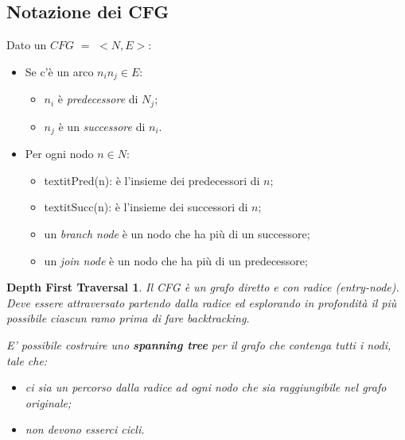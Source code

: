 \documentclass[a4paper, 11pt]{report}
\begin{document}
\subsection*{Notazione dei CFG}
Dato un $CFG$ $=$ $<N, E>$:
\begin{itemize}
	\item Se c'è un arco $n_in_j\in E$:
	\begin{itemize}
		\item $n_i$ è \textit{predecessore} di $N_j$;
		\item $n_j$ è un \textit{successore} di $n_i$.
	\end{itemize}
	\item Per ogni nodo $n\in N$:
	\begin{itemize}
		\item textit{Pred(n)}: è l'insieme dei predecessori di $n$;
		\item textit{Succ(n)}: è l'insieme dei successori di $n$;
		\item un \textit{branch node} è un nodo che ha più di un successore;
		\item un \textit{join node} è un nodo che ha più di un predecessore; 
	\end{itemize}
\end{itemize}

\newtheorem*{definit2}{Depth First Traversal}
\begin{definit2}
	Il CFG è un grafo diretto e con radice (entry-node). Deve essere attraversato partendo dalla radice ed esplorando in profondità il più possibile ciascun ramo prima di fare backtracking.
	
	E' possibile costruire uno \textbf{spanning tree} per il grafo che contenga tutti i nodi, tale che:
	\begin{itemize}
		\item ci sia un percorso dalla radice ad ogni nodo che sia raggiungibile nel grafo originale;
		\item non devono esserci cicli.
	\end{itemize}
\end{definit2}
\end{document}
